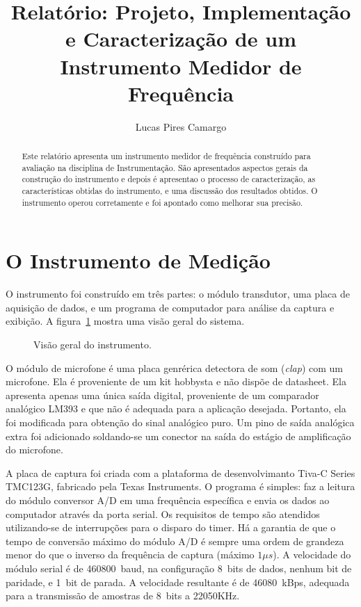 \documentclass[a4paper,9pt,twocolumn]{article}
\title{Relatório: Projeto, Implementação e Caracterização de um Instrumento Medidor de Frequência}
\author{Lucas Pires Camargo}
\newcommand{\fig}[4][ht!]{
  \begin{figure}[#1]
    {\centering{\texttt{[image: \#2]}}\par}
    \caption{#3}
    \label{fig:#2}
  \end{figure}
}
\begin{document}
\maketitle

\begin{abstract}
Este relatório apresenta um instrumento medidor de frequência construído para avaliação na disciplina de Instrumentação. 
São apresentados aspectos gerais da construção do instrumento e depois é apresentao o processo de caracterização, as 
características obtidas do instrumento, e uma discussão dos resultados obtidos. O instrumento operou corretamente e
foi apontado como melhorar sua precisão.
\end{abstract}


\section{O Instrumento de Medição}

O instrumento foi construído em três partes: o módulo transdutor, uma placa de aquisição de dados, 
e um programa de computador para análise da captura e exibição. A figura~\ref{fig:impl} mostra uma visão geral do sistema.

\fig{impl}{Visão geral do instrumento.}{width=\columnwidth}

O módulo de microfone é uma placa genrérica detectora de som (\emph{clap}) com um microfone. Ela é proveniente de um kit hobbysta e não dispõe 
de datasheet. Ela apresenta apenas uma única saída digital, proveniente de um comparador analógico LM393 e que não é adequada 
para a aplicação desejada. Portanto, ela foi modificada para obtenção do sinal analógico puro. 
Um pino de saída analógica extra foi adicionado soldando-se um conector na saída do estágio de amplificação do microfone. 

A placa de captura foi criada com a plataforma de desenvolvimanto Tiva-C Series TMC123G, fabricado pela Texas Instruments.
O programa é simples: faz a leitura do módulo conversor A/D em uma frequência específica e envia os dados ao computador através da porta serial.
Os requisitos de tempo são atendidos utilizando-se de interrupções para o disparo do timer. Há a garantia de que o tempo de conversão máximo do módulo A/D
é sempre uma ordem de grandeza menor do que o inverso da frequência de captura (máximo $1\mu{}s$). A velocidade do módulo serial é de 460800~baud, 
na configuração 8~bits de dados, nenhum bit de paridade, e 1~bit de parada. A velocidade resultante é de 46080~kBps, adequada para a transmissão 
de amostras de 8~bits a 22050KHz.
\end{document}
